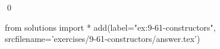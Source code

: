 
\begin{ex}
  \label{ex:9-61-constructors}
  
  \qed
\end{ex}
\begin{python0}
from solutions import *
add(label="ex:9-61-constructors",
    srcfilename='exercises/9-61-constructors/answer.tex')
\end{python0}
